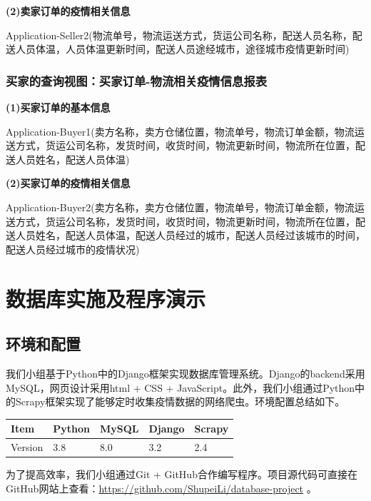 \documentclass[12pt]{article}
\begin{document}
\vspace{0.3cm}
\noindent \textbf{(2)卖家订单的疫情相关信息} \par 
\noindent Application-Seller2(物流单号，物流运送方式，货运公司名称，配送人员名称，配送人员体温，人员体温更新时间，配送人员途经城市，途径城市疫情更新时间)

\subsubsection{买家的查询视图：买家订单-物流相关疫情信息报表}

\noindent \textbf{(1)买家订单的基本信息} \par 
\noindent Application-Buyer1(卖方名称，卖方仓储位置，物流单号，物流订单金额，物流运送方式，货运公司名称，发货时间，收货时间，物流更新时间，物流所在位置，配送人员姓名，配送人员体温)

\vspace{0.3cm}
\noindent \textbf{(2)买家订单的疫情相关信息} \par 
\noindent Application-Buyer2(卖方名称，卖方仓储位置，物流单号，物流订单金额，物流运送方式，货运公司名称，发货时间，收货时间，物流更新时间，物流所在位置，配送人员姓名，配送人员体温，配送人员经过的城市，配送人员经过该城市的时间，配送人员经过城市的疫情状况)

\newpage
\section{数据库实施及程序演示}
\subsection{环境和配置}

我们小组基于Python中的Django框架实现数据库管理系统。Django的backend采用MySQL，网页设计采用html + CSS + JavaScript。此外，我们小组通过Python中的Scrapy框架实现了能够定时收集疫情数据的网络爬虫。环境配置总结如下。

\begin{center}
	\begin{tabular}{lllll}
	\toprule
	Item & Python & MySQL & Django & Scrapy \\
	\midrule
	Version & 3.8 & 8.0 & 3.2 & 2.4\\
	\bottomrule
\end{tabular}
\end{center}

为了提高效率，我们小组通过Git + GitHub合作编写程序。项目源代码可直接在GitHub网站上查看：\url{https://github.com/ShupeiLi/database-project} 。
\end{document}
